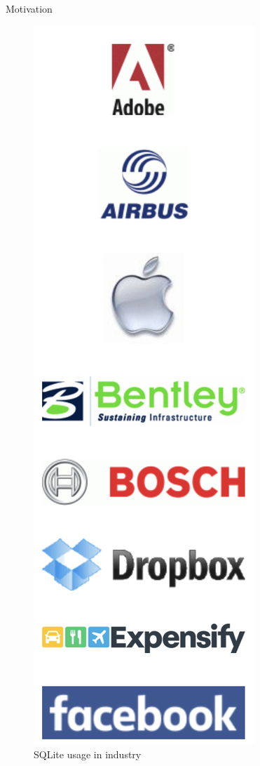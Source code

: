 \documentclass[handout, xcolor={dvipsnames}]{beamer}
\begin{document}
\begin{frame}{Motivation}{}
\begin{itemize}
{\begin{itemize}
\begin{figure}
           \includegraphics[scale = 0.1]{SQL_use.png}
           \caption{SQLite usage in industry}
           \label{fig:sql_prev}
       \end{figure}
   \end{itemize}
  }

  \end{itemize}
\end{frame}
\end{document}
